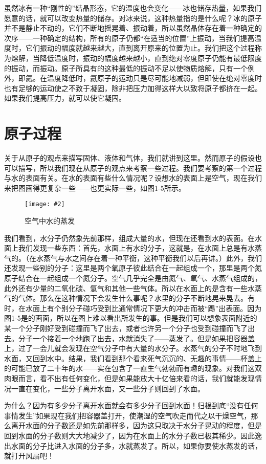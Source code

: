 \documentclass[12pt,oneside]{book}
\newenvironment{fig}[2][1]
{\begin{figure}[H]
\centering
\texttt{[image: \#2]}}
{\end{figure}}
\begin{document}
虽然冰有一种“刚性的”结晶形态，它的温度也会变化——冰也储存热量，如果我们愿意的话，就可以改变热量的储存。对冰来说，这种热量指的是什么呢？冰的原子并不是静止不动的，它们不断地摇晃着、振动着，所以虽然晶体存在着一种确定的次序——一种确定的结构，所有的原子仍都“在适当的位置”上振动，当我们提高温度时，它们振动的幅度就越来越大，直到离开原来的位置为止。我们把这个过程称为熔解，当降低温度时，振动的幅度越来越小，直到绝对零度原子仍能有最低限度的振动，而振动。原子所具有的这种最低的振动不足以使物质熔解，只有一个例外，即氦。在温度降低时，氦原子的运动只是尽可能地减弱，但即使在绝对零度时也有足够的运动使之不致于凝固，除非把压力加得这样大以致将原子都挤在一起。如果我们提高压力，就可以使它凝固。


\section{原子过程}
关于从原子的观点来描写固体、液体和气体，我们就讲到这里。然而原子的假设也可以描写，所以我们现在从原子的观点来考察一些过程。我们要考察的第一个过程与水的表面有关。在水的表面有些什么情况呢？设想水的表面上是空气，现在我们来把图画得更复杂一些——也更实际一些，如图1-5所示。
\begin{fig}{空气中水的蒸发}
\caption{空气中水的蒸发}
\label{fig:空气中水的蒸发}
\end{fig}
我们看到，水分子仍然象先前那样，组成大量的水，但现在还看到水的表面。在水面上我们发现一些东西：首先，水面上有水的分子，这就是，在水面上总是有水蒸气的。（在水蒸气与水之间存在着一种平衡，这种平衡我们以后再讲。）此外，我们还发现一些别的分子：这里是两个氧原子彼此结合在一起组成一个，那里是两个氮原子结合在一起组成一个氮分子。空气几乎完全是由氮气、氧气、水蒸气组成的，此外还有少量的二氧化碳、氩气和其他一些气体。所以在水面上的是含有一些水蒸气的气体。那么在这种情况下会发生什么事呢？水里的分子不断地晃来晃去。有时，在水面上有个别分子碰巧受到比通常情况下更大的冲击而被“踢”出表面。因为图1-5是的画面，所以在图上难以看出所发生的事。但是我们可以想象表面附近的某一个分子刚好受到碰撞而飞了出去，或者也许另一个分子也受到碰撞而飞了出去。分子一个接着一个地跑了出去，水就消失了——蒸发了。但是如果把容器盖上，过了一会儿就会发现在空气分子中有大量的水分子。水蒸气的分子不时地飞到水面，又回到水中。结果，我们看到那个看来死气沉沉的、无趣的事情——杯盖上的可能已放了二十年的水——实在包含了一直生气勃勃而有趣的现象。对我们这双肉眼而言，看不出有任何变化，但是如果能放大十亿倍来看的话，我们就能发现情况一直在变化，一些分子离开水面，又一些分子则回到了水面。

为什么？因为有多少分子离开水面就会有多少分子回到水面！归根到底“没有任何事情发生”如果现在我们把容器盖打开，使潮湿的空气吹走而代之以干燥空气，那么离开水面的分子数还是如先前那样多，因为这只取决于水分子晃动的程度，但是回到水面的分子数则大大地减少了，因为在水面上的水分子数已极其稀少。因此逸出水面的分子比进入水面的分子多，水就蒸发了。所以，如果你要使水蒸发的话，就打开风扇吧！
\end{document}
